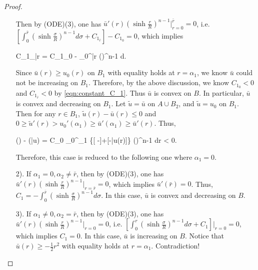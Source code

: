 \begin{proof}
\begin{itemize}
		Then by (ODE)(3), one has $\bar{u}'(r)(\sinh\frac{r}{R})^{n-1}|_{r=0}^{\bar{r}} =0$, i.e. $[\int_{0}^{\bar{r}} (\sinh\frac{\sigma }{R})^{n-1} d\sigma  +C_{1_{\bar{r}}}] - C_{1_0} =0$, which implies 
		\begin{flalign}\label{eqn:constant_C_1}
			C_{1_{\bar{r}}} = C_{1_0} -  \int_{0}^{\bar{r}} (\sinh{})^{n-1} d\sigma .
		\end{flalign}
		Since $\bar{u}(r) \ge u_{0} (r)$ on $B_1$ with equality holds at $r= \alpha_1$, we know $\bar{u}$ could not be increasing on $B_1$. Therefore, by the above discussion, we know $C_{1_0} <0$ and $C_{1_{\bar{r}}}<0$ by \eqref{eqn:constant_C_1}. Thus $\bar{u}$ is convex on $B$. In particular,  $\bar{u}$ is convex and decreasing on $B_1$. Let $\tilde{u} = \bar{u}$ on $A \cup B_2$, and $\tilde{u} = u_{0}$ on $B_1$. Then for any $r\in B_1$, $\tilde{u}(r) - \bar{u}(r) \le 0$ and $0\ge  \tilde{u}'(r)> u_{0}'(\alpha_1) \ge \bar{u}'(\alpha_1) \ge \bar{u}'(r) $. Thus,
		\begin{flalign}
			() - (\bar{u}) = C_0 \int_{0}^{\alpha_1} \Big\{[ -]+[-\bar{u}(r)]\Big\} (\sinh{})^{n-1} dr < 0.
		\end{flalign}
		Therefore, this case is reduced to the following one where $\alpha_1 =0$.
	
		\item[2).] 	If $\alpha_1=0, \alpha_2\neq\bar{r}$, then by (ODE)(3), one has $\bar{u}'(r)(\sinh\frac{r}{R})^{n-1}|_{r=\bar{r}} =0$, which implies $\bar{u}'(\bar{r}) =0$. Thus, $C_1 = -\int_{0}^{\bar{r}} (\sinh\frac{\sigma }{R})^{n-1} d\sigma $. In this case, $\bar{u}$ is convex and decreasing on $B$.
		
		\item [3).] If $\alpha_1\neq0,\alpha_2=\bar{r}$, then by (ODE)(3), one has $\bar{u}'(r)(\sinh\frac{r}{R})^{n-1}|_{r=0} =0$, i.e. $[\int_{0}^{r} (\sinh\frac{\sigma }{R})^{n-1} d\sigma  +C_1]|_{r=0} =0$, which implies $C_1 = 0$. In this case, $\bar{u}$ is increasing on $B$. Notice that $\bar{u}(r)\ge -\frac{1}{2} r^2$ with equality holds at $r=\alpha_1$. Contradiction!
	\end{itemize}


\end{proof}
